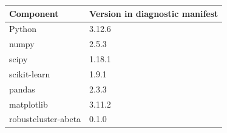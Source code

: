 \begin{tabular}{@{}ll@{}}\toprule Component & Version in diagnostic manifest\\\midrule
Python & 3.12.6 \\
numpy & 2.5.3 \\
scipy & 1.18.1 \\
scikit-learn & 1.9.1 \\
pandas & 2.3.3 \\
matplotlib & 3.11.2 \\
robustcluster-abeta & 0.1.0 \\
\bottomrule\end{tabular}
